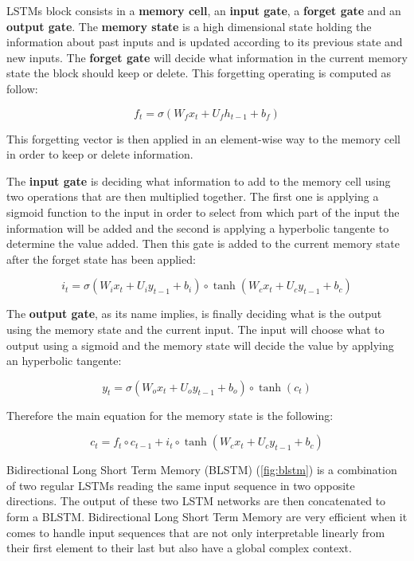 \documentclass[master, tikz, final,11pt, dvipdfmx]{iscs-thesis}
\begin{document}
LSTMs block consists in a \textbf{memory cell}, an \textbf{input gate}, a \textbf{forget gate} and an \textbf{output gate}.
The \textbf{memory state} is a high dimensional state holding the information about past inputs and is updated according to its previous state and new inputs.
The \textbf{forget gate} will decide what information in the current memory state the block should keep or delete. This forgetting operating is computed as follow:

\[f_t = \sigma(W_{f} x_t + U_{f} h_{t-1} + b_f)\]

This forgetting vector is then applied in an element-wise way to the memory cell in order to keep or delete information.

The \textbf{input gate} is deciding what information to add to the memory cell using two operations that are then multiplied together. The first one is applying a sigmoid function to the input in order to select from which part of the input the information will be added and the second is applying a hyperbolic tangente to determine the value added. Then this gate is added to the current memory state after the forget state has been applied:

\[i_t = \sigma(W_{i} x_t + U_{i} y_{t-1} + b_i) \circ \tanh(W_{c} x_t + U_{c} y_{t-1} + b_c)\]

The \textbf{output gate}, as its name implies, is finally deciding what is the output using the memory state and the current input. The input will choose what to output using a sigmoid and the memory state will decide the value by applying an hyperbolic tangente:

\[y_t = \sigma(W_{o} x_t + U_{o} y_{t-1} + b_o) \circ \tanh(c_t)\]

Therefore the main equation for the memory state is the following:

\[c_t = f_t \circ c_{t-1} + i_t \circ \tanh(W_{c} x_t + U_{c} y_{t-1} + b_c)\]

Bidirectional Long Short Term Memory (BLSTM) (\autoref{fig:blstm}) is a combination of two regular LSTMs reading the same input sequence in two opposite directions. The output of these two LSTM networks are then concatenated to form a BLSTM. Bidirectional Long Short Term Memory are very efficient when it comes to handle input sequences that are not only interpretable linearly from their first element to their last but also have a global complex context.
\end{document}

